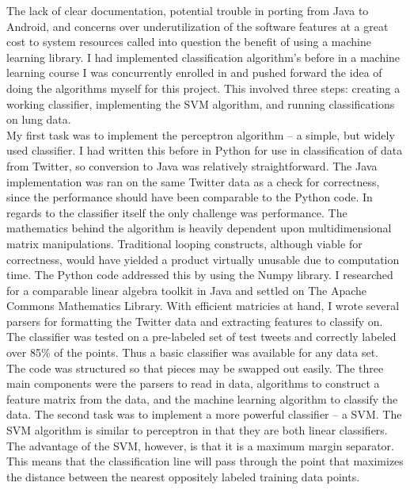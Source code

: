 \documentclass{article}
\begin{document}
The lack of clear documentation, potential trouble in porting from Java to Android, and concerns over underutilization of the software features at a great cost to system resources called into question the benefit of using a machine learning library. I had implemented classification algorithm's before in a machine learning course I was concurrently enrolled in and pushed forward the idea of doing the algorithms myself for this project. This involved three steps: creating a working classifier, implementing the SVM algorithm, and running classifications on lung data.\\

My first task was to implement the perceptron algorithm -- a simple, but widely used classifier. I had written this before in Python for use in classification of data from Twitter, so conversion to Java was relatively straightforward. The Java implementation was ran on the same Twitter data as a check for correctness, since the performance should have been comparable to the Python code. In regards to the classifier itself the only challenge was performance. The mathematics behind the algorithm is heavily dependent upon multidimensional matrix manipulations. Traditional looping constructs, although viable for correctness, would have yielded a product virtually unusable due to computation time. The Python code addressed this by using the Numpy library. I researched for a comparable linear algebra toolkit in Java and settled on The Apache Commons Mathematics Library. With efficient matricies at hand, I wrote several parsers for formatting the Twitter data and extracting features to classify on. The classifier was tested on a pre-labeled set of test tweets and correctly labeled over 85\% of the points. Thus a basic classifier was available for any data set.\\

The code was structured so that pieces may be swapped out easily. The three main components were the parsers to read in data, algorithms to construct a feature matrix from the data, and the machine learning algorithm to classify the data. The second task was to implement a more powerful classifier -- a SVM. The SVM algorithm is similar to perceptron in that they are both linear classifiers. The advantage of the SVM, however, is that it is a maximum margin separator. This means that the classification line will pass through the point that maximizes the distance between the nearest oppositely labeled training data points. 
\end{document}
